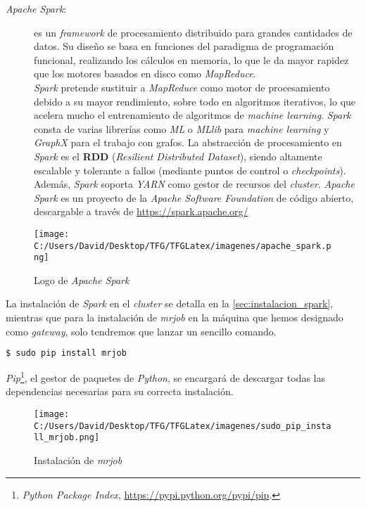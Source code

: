 \begin{description}
  \item[\textit{Apache Spark}:] es un \textit{framework} de procesamiento 
  distribuido para grandes cantidades de datos. Su diseño se basa en funciones del paradigma de programación 
  funcional, realizando los cálculos en memoria, lo que le da mayor rapidez que los motores basados en disco 
  como \textit{MapReduce}.\\
  \textit{Spark} pretende sustituir a \textit{MapReduce} como motor de procesamiento debido a su 
  mayor rendimiento, sobre todo en algoritmos iterativos, lo que acelera mucho el entrenamiento 
  de algoritmos de \textit{machine learning}.
  \textit{Spark} consta de varias librerías como \textit{ML} o \textit{MLlib} para \textit{machine learning} y 
  \textit{GraphX} para el trabajo con grafos.
  La abstracción de procesamiento en \textit{Spark} es el \textbf{RDD} (\textit{Resilient Distributed Dataset}), 
  siendo altamente escalable y tolerante a fallos (mediante puntos de control o \textit{checkpoints}).
  Además, \textit{Spark} soporta \textit{YARN} como gestor de recursos del \textit{cluster}.
  \textit{Apache Spark} es un proyecto de la \textit{Apache Software Foundation} de código abierto, descargable a 
  través de \url{https://spark.apache.org/}
\end{description}


\begin{figure}[!htpb]
  \centering
  \texttt{[image: C:/Users/David/Desktop/TFG/TFGLatex/imagenes/apache\_spark.png]}
  \caption[Logo \textit{Apache Spark}]{Logo de \textit{Apache Spark}}
  \label{spark-devs1}
\end{figure}

La instalación de \textit{Spark} en el \textit{cluster} se detalla en la \autoref{sec:instalacion_spark},
mientras que para la instalación de \textit{mrjob} en la máquina que hemos designado como \textit{gateway},
solo tendremos que lanzar un sencillo comando.\\

\begin{lstlisting}[language=bash, numbers=none]
$ sudo pip install mrjob
\end{lstlisting}

\textit{Pip}\footnote{\textit{Python Package Index}, \url{https://pypi.python.org/pypi/pip}.}, 
el gestor de paquetes de \textit{Python}, se encargará de descargar todas las dependencias
 necesarias para su correcta instalación.

\begin{figure}[!htpb]
  \centering
  \texttt{[image: C:/Users/David/Desktop/TFG/TFGLatex/imagenes/sudo\_pip\_install\_mrjob.png]}
  \caption[Instalación de \textit{mrjob}]{Instalación de \textit{mrjob}}
  \label{sudo_pip_install_mrjob}
\end{figure}

\clearpage